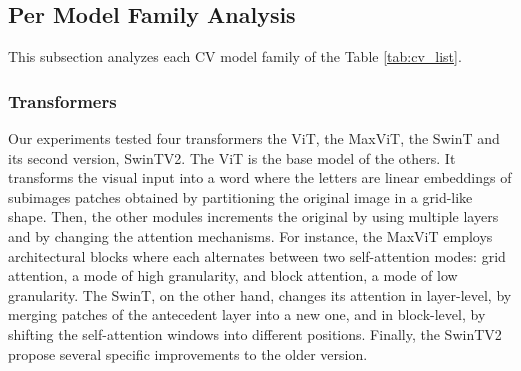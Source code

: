 \subsection{Per Model Family Analysis}
 
This subsection analyzes each \gls{CV} model family of the Table \ref{tab:cv_list}.
 
\subsubsection{Transformers}

Our experiments tested four transformers the \gls{ViT}, the \gls{MaxViT}, the \gls{SwinT} and its second version, \gls{SwinTV2}. The \gls{ViT} is the base model of the others. It transforms the visual input into a word where the letters are linear embeddings of subimages patches obtained by partitioning the original image in a grid-like shape. Then, the other modules increments the original by using multiple layers and by changing the attention mechanisms. For instance, the \gls{MaxViT} employs architectural blocks where each alternates between two self-attention modes: grid attention, a mode of high granularity, and block attention, a mode of low granularity. The \gls{SwinT}, on the other hand, changes its attention in layer-level, by merging patches of the antecedent layer into a new one, and in block-level, by shifting the self-attention windows into different positions. Finally, the \gls{SwinTV2} propose several specific improvements to the older version.

